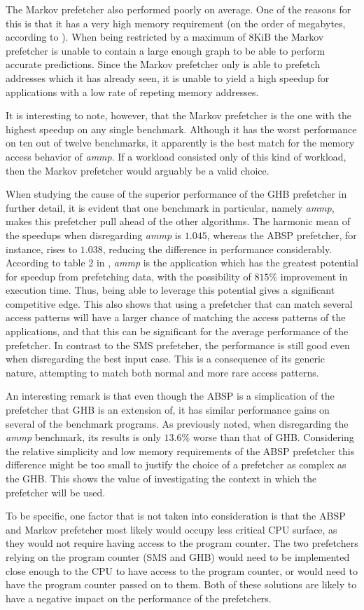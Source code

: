 The Markov prefetcher also performed poorly on average. One of the
reasons for this is that it has a very high memory requirement (on the
order of megabytes, according to \cite{Nesbit}). When being restricted
by a maximum of 8KiB the Markov prefetcher is unable to contain a
large enough graph to be able to perform accurate predictions. Since
the Markov prefetcher only is able to prefetch addresses which it has
already seen, it is unable to yield a high speedup for applications
with a low rate of repeting memory addresses.

It is interesting to note, however, that the Markov prefetcher is the
one with the highest speedup on any single benchmark. Although it has
the worst performance on ten out of twelve benchmarks, it apparently
is the best match for the memory access behavior of \emph{ammp}. If a
workload consisted only of this kind of workload, then the Markov
prefetcher would arguably be a valid choice.

When studying the cause of the superior performance of the GHB
prefetcher in further detail, it is evident that one benchmark in
particular, namely \emph{ammp}, makes this prefetcher pull ahead of
the other algorithms. The harmonic mean of the speedups when
disregarding \emph{ammp} is $1.045$, whereas the ABSP prefetcher, for
instance, rises to $1.038$, reducing the difference in performance
considerably. According to table 2 in \cite{Nesbit}, \emph{ammp} is
the application which has the greatest potential for speedup from
prefetching data, with the possibility of $815\%$ improvement in
execution time. Thus, being able to leverage this potential gives a
significant competitive edge. This also shows that using a prefetcher
that can match several access patterns will have a larger chance of
matching the access patterns of the applications, and that this can be
significant for the average performance of the prefetcher. In contrast
to the SMS prefetcher, the performance is still good even when
disregarding the best input case. This is a consequence of its generic
nature, attempting to match both normal and more rare access patterns.

An interesting remark is that even though the ABSP is a simplication
of the prefetcher that GHB is an extension of, it has similar
performance gains on several of the benchmark programs. As previously
noted, when disregarding the \emph{ammp} benchmark, its results is
only $13.6\%$ worse than that of GHB. Considering the relative
simplicity and low memory requirements of the ABSP prefetcher this
difference might be too small to justify the choice of a prefetcher as
complex as the GHB. This shows the value of investigating the context
in which the prefetcher will be used.

To be specific, one factor that is not taken into consideration is
that the ABSP and Markov prefetcher most likely would occupy less
critical CPU surface, as they would not require having access to the
program counter. The two prefetchers relying on the program counter
(SMS and GHB) would need to be implemented close enough to the CPU to
have access to the program counter, or would need to have the program
counter passed on to them. Both of these solutions are likely to have
a negative impact on the performance of the prefetchers.

